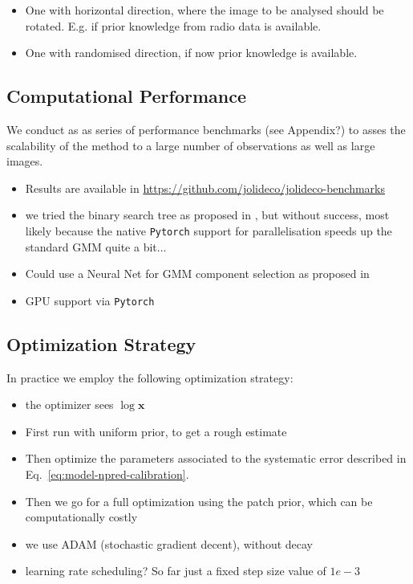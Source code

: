 \documentclass[twocolumn]{aastex631}
\begin{document}
    \begin{itemize}
        \item One with horizontal direction, where the image to be analysed should be rotated. E.g. if prior knowledge from radio data is available.
        \item One with randomised direction, if now prior knowledge is available.
    \end{itemize}
    

    \subsection{Computational Performance}
    We conduct as as series of performance benchmarks (see Appendix?) to asses the scalability of the method to a large number of observations
    as well as large images. 

    \begin{itemize}
        \item Results are available in \url{https://github.com/jolideco/jolideco-benchmarks}
        \item we tried the binary search tree as proposed in \cite{Parameswaran2018},
        but without success, most likely because the native \texttt{Pytorch} support
        for parallelisation speeds up the standard GMM quite a bit...
        \item Could use a Neural Net for GMM component selection as proposed in
        \item GPU support via \texttt{Pytorch}

    \end{itemize}

    \subsection{Optimization Strategy}
    In practice we employ the following optimization strategy:
    \begin{itemize}
        \item the optimizer sees $\log{\mathbf{x}}$
        \item First run with uniform prior, to get a rough estimate
        \item Then optimize the parameters associated to the systematic error described in Eq.~\ref{eq:model-npred-calibration}.
        \item Then we go for a full optimization using the patch prior, which can be computationally costly
        \item we use ADAM (stochastic gradient decent), without decay
        \item learning rate scheduling? So far just a fixed step size value of $1e-3$
    \end{itemize}
    
\end{document}
